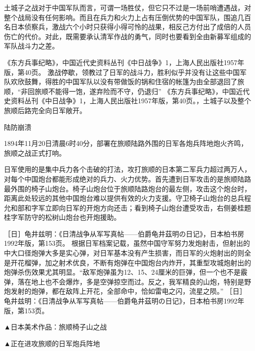 \documentclass[12pt,UTF8]{ctexbook}
\begin{document}
土城子之战对于中国军队而言，可谓一场胜仗，但它只不过是一场前哨遭遇战，对整个战局没有任何影响。而且在兵力和火力上占有压倒优势的中国军队，围追几百名日本侦察兵，激战六个小时只获得小得可怜的战果，相反己方付出了成倍的人员伤亡的代价。对此，既需要承认清军作战的勇气，同时也要看到全由新募军组成的军队战斗力之差。

《东方兵事纪略》，中国近代史资料丛刊《中日战争》1，上海人民出版社1957年版，第40页。
激战停歇，领教过了日军的战斗力，胜利似乎并没有让这些中国军队欢欣鼓舞，得胜的中国军队以没有带做饭的锅和住宿的帐篷为由全部退回了旅顺，“非回旅顺不能得一饱，遂弃险而不守，仍退归” 《东方兵事纪略》，中国近代史资料丛刊《中日战争》1，上海人民出版社1957年版，第40页。，土城子以及整个旅顺后路完全向日军敞开。

陆防崩溃

1894年11月20日清晨6时40分，部署在旅顺陆路外围的日军各炮兵阵地炮火齐鸣，旅顺之战正式打响。

日军使用的是集中兵力各个击破的打法，攻打旅顺的日本第二军兵力超过两万人，对每个中国炮台都能形成绝对的兵力、火力优势。首先遭到日军攻击的是旅顺陆路最外围的椅子山炮台。椅子山炮台位于旅顺陆路炮台的最左侧，攻击这个炮台时，距离此处较远的其他中国炮台难以提供有效的火力支援。守卫椅子山炮台的总兵程允和部和字军立即向日军的开炮方向还击；看到椅子山炮台遭受攻击，右侧姜桂题桂字军防守的松树山炮台也开炮援助。

［日］龟井兹明：《日清战争从军写真帖——伯爵龟井茲明の日记》，日本柏书房1992年版，第153页。
根据日军档案记载，虽然中国守军努力发炮射击，但射出的中大口径炮弹大多是实心弹，对日军基本没有产生损害，而日军的火炮射出的则全是开花榴弹，加之射术优良，不断有炮弹在中国炮台内炸开，其重型攻城炮射出的炮弹杀伤效果尤其明显。“敌军炮弹虽为12、15、24厘米的巨弹，但一个也不是霰弹，落在地上也不会爆炸，多是空弹掠空而过。反之，我军精良的山炮，特别是野炮发射的炮弹，都在敌阵上开花，全部命中，恰如雷电之闪，流星之陨。” ［日］龟井兹明：《日清战争从军写真帖——伯爵龟井茲明の日记》，日本柏书房1992年版，第153页。


▲日本美术作品：旅顺椅子山之战


▲正在进攻旅顺的日军炮兵阵地
\end{document}
